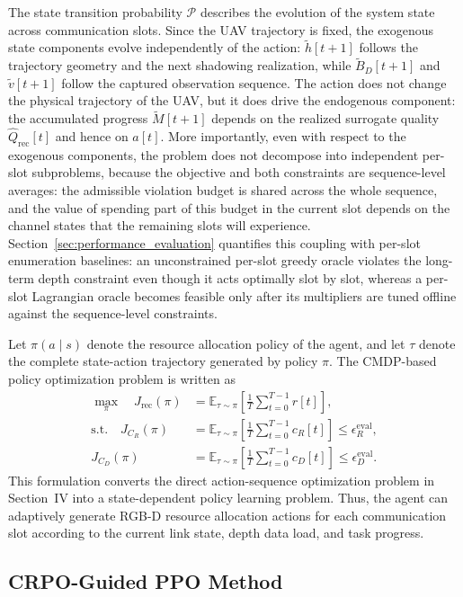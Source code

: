 \documentclass[journal]{IEEEtran}
\begin{document}
The state transition probability $\mathcal{P}$ describes the evolution of the system state across communication slots. Since the UAV trajectory is fixed, the exogenous state components evolve independently of the action: $\tilde{h}[t+1]$ follows the trajectory geometry and the next shadowing realization, while $\tilde{B}_D[t+1]$ and $\tilde{v}[t+1]$ follow the captured observation sequence. The action does not change the physical trajectory of the UAV, but it does drive the endogenous component: the accumulated progress $\tilde{M}[t+1]$ depends on the realized surrogate quality $\hat{Q}_{\mathrm{rec}}[t]$ and hence on $a[t]$. More importantly, even with respect to the exogenous components, the problem does not decompose into independent per-slot subproblems, because the objective and both constraints are sequence-level averages: the admissible violation budget is shared across the whole sequence, and the value of spending part of this budget in the current slot depends on the channel states that the remaining slots will experience. Section~\ref{sec:performance_evaluation} quantifies this coupling with per-slot enumeration baselines: an unconstrained per-slot greedy oracle violates the long-term depth constraint even though it acts optimally slot by slot, whereas a per-slot Lagrangian oracle becomes feasible only after its multipliers are tuned offline against the sequence-level constraints.

Let $\pi(a \mid s)$ denote the resource allocation policy of the agent, and let $\tau$ denote the complete state-action trajectory generated by policy $\pi$. The CMDP-based policy optimization problem is written as
\begin{align}
\max_{\pi}\quad
J_{\mathrm{rec}}(\pi)
&=
\mathbb{E}_{\tau\sim\pi}
\left[
\frac{1}{T}
\sum_{t=0}^{T-1}
r[t]
\right],
\\
\mathrm{s.t.}\quad
J_{C_R}(\pi)
&=
\mathbb{E}_{\tau\sim\pi}
\left[
\frac{1}{T}
\sum_{t=0}^{T-1}
c_R[t]
\right]
\leq
\epsilon_R^{\mathrm{eval}},
\\
J_{C_D}(\pi)
&=
\mathbb{E}_{\tau\sim\pi}
\left[
\frac{1}{T}
\sum_{t=0}^{T-1}
c_D[t]
\right]
\leq
\epsilon_D^{\mathrm{eval}}.
\end{align}
This formulation converts the direct action-sequence optimization problem in Section~IV into a state-dependent policy learning problem. Thus, the agent can adaptively generate RGB-D resource allocation actions for each communication slot according to the current link state, depth data load, and task progress.

\subsection{CRPO-Guided PPO Method}
\end{document}
